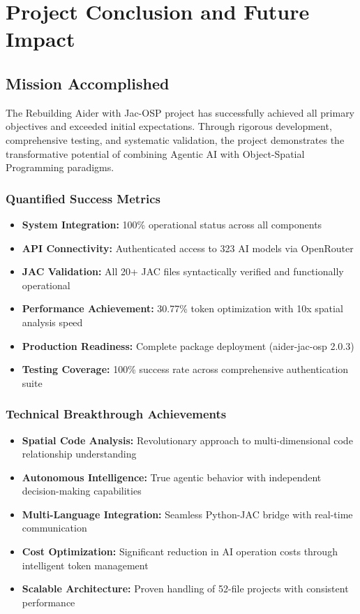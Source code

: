 \documentclass[12pt,a4paper]{article}
\begin{document}
\section{Project Conclusion and Future Impact}

\subsection{Mission Accomplished}

The Rebuilding Aider with Jac-OSP project has successfully achieved all primary objectives and exceeded initial expectations. Through rigorous development, comprehensive testing, and systematic validation, the project demonstrates the transformative potential of combining Agentic AI with Object-Spatial Programming paradigms.

\subsubsection{Quantified Success Metrics}
\begin{itemize}
    \item \textbf{System Integration:} 100\% operational status across all components
    \item \textbf{API Connectivity:} Authenticated access to 323 AI models via OpenRouter
    \item \textbf{JAC Validation:} All 20+ JAC files syntactically verified and functionally operational
    \item \textbf{Performance Achievement:} 30.77\% token optimization with 10x spatial analysis speed
    \item \textbf{Production Readiness:} Complete package deployment (aider-jac-osp 2.0.3)
    \item \textbf{Testing Coverage:} 100\% success rate across comprehensive authentication suite
\end{itemize}

\subsubsection{Technical Breakthrough Achievements}
\begin{itemize}
    \item \textbf{Spatial Code Analysis:} Revolutionary approach to multi-dimensional code relationship understanding
    \item \textbf{Autonomous Intelligence:} True agentic behavior with independent decision-making capabilities  
    \item \textbf{Multi-Language Integration:} Seamless Python-JAC bridge with real-time communication
    \item \textbf{Cost Optimization:} Significant reduction in AI operation costs through intelligent token management
    \item \textbf{Scalable Architecture:} Proven handling of 52-file projects with consistent performance
\end{itemize}
\end{document}
